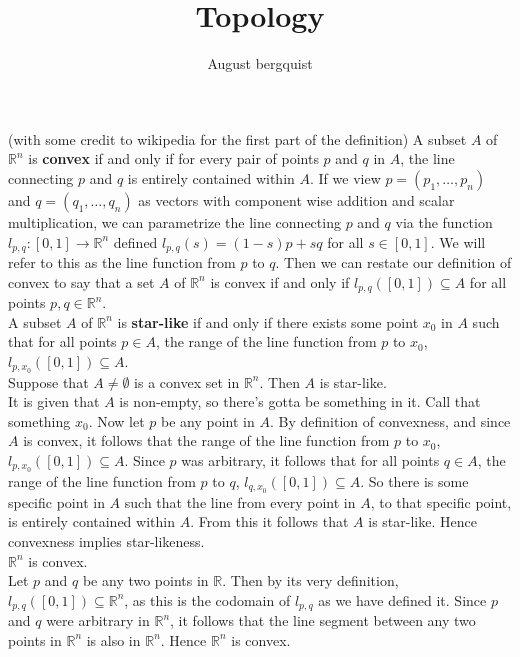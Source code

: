 \documentclass{article}
\title{Topology}
\author{August bergquist}
\newcommand{\R}{\mathbb{R}}
\newcommand{\R}{\mathbb{R}}
\begin{document}
\maketitle



 (with some credit to wikipedia for the first part of the definition) A subset $A$ of $\R^n$ is \textbf{convex} if and only if for every pair of points $p$ and $q$ in $A$, the line connecting $p$ and $q$ is entirely contained within $A$. If we view $p = (p_1, \dots, p_n)$ and $q = (q_1,\dots, q_n)$ as vectors with component wise addition and scalar multiplication, we can parametrize the line connecting $p$ and $q$ via the function $l_{p,q}:[0,1]\rightarrow \R^n$ defined $l_{p,q}(s) = (1-s)p + sq$ for all $s\in [0,1]$. We will refer to this as the line function from $p$ to $q$. Then we can restate our definition of convex to say that a set $A$ of $\R^n$ is convex if and only if $l_{p,q}([0,1])\subseteq A$ for all points $p,q\in \R^n$.\\

 A subset $A$ of $\R^n$ is \textbf{star-like} if and only if there exists some point $x_0$ in $A$ such that for all points $p\in A$, the range of the line function from $p$ to $x_0$, $l_{p,x_0}([0,1]) \subseteq A$.\\

 Suppose that $A\ne \emptyset$ is a convex set in $\R^n$. Then $A$ is star-like.\\

 It is given that $A$ is non-empty, so there's gotta be something in it. Call that something $x_0$. Now let $p$ be any point in $A$. By definition of convexness, and since $A$ is convex, it follows that the range of the line function from $p$ to $x_0$, $l_{p,x_0}([0,1])\subseteq A$. Since $p$ was arbitrary, it follows that for all points $q\in A$, the range of the line function from $p$ to $q$, $l_{q,x_0}([0,1])\subseteq A$. So there is some specific point in $A$ such that the line from every point in $A$, to that specific point, is entirely contained within $A$. From this it follows that $A$ is star-like. Hence convexness implies star-likeness. \\

 $\R^n$ is convex.\\

 Let $p$ and $q$ be any two points in $\R$. Then by its very definition, $l_{p,q}([0,1])\subseteq \R^n$, as this is the codomain of $l_{p,q}$ as we have defined it. Since $p$ and $q$ were arbitrary in $\R^n$, it follows that the line segment between any two points in $\R^n$ is also in $\R^n$. Hence $\R^n$ is convex.
\end{document}
